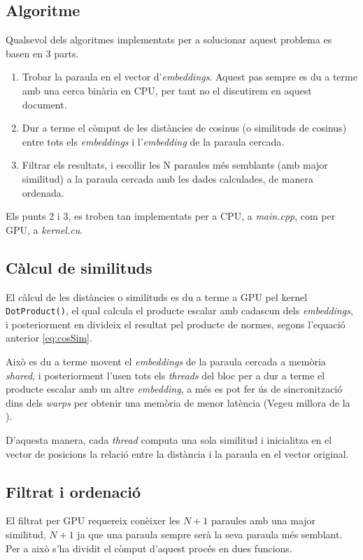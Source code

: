 \documentclass[catalan,10pt,a4paper]{article}
\begin{document}
\subsection*{Algoritme}
Qualsevol dels algoritmes implementats per a solucionar aquest problema es basen en 3 parts.
\begin{enumerate}
	\item Trobar la paraula en el vector d'\textit{embeddings}. Aquest pas sempre es du a terme amb una cerca binària en CPU, per tant no el discutirem en aquest document.
	\item Dur a terme el còmput de les distàncies de cosinus (o similituds de cosinus) entre tots els \textit{embeddings} i l'\textit{embedding} de la paraula cercada.
	\item Filtrar els resultats, i escollir les N paraules més semblants (amb major similitud) a la paraula cercada amb les dades calculades, de manera ordenada.
\end{enumerate}

Els punts 2 i 3, es troben tan implementats per a CPU, a \textit{main.cpp}, com per GPU, a \textit{kernel.cu}.

\subsection*{Càlcul de similituds}
El càlcul de les distàncies o similituds es du a terme a GPU pel kernel \verb|DotProduct()|, el qual calcula el producte escalar amb cadascun dels \textit{embeddings}, i posteriorment en divideix el resultat pel producte de normes, segons l'equació anterior \ref{eq:cosSim}.

Això es du a terme movent el \textit{embeddings} de la paraula cercada a memòria \textit{shared}, i posteriorment l'usen tots els \textit{threads} del bloc per a dur a terme el producte escalar amb un altre \textit{embedding}, a més es pot fer ús de sincronització dins dels \textit{warps} per obtenir una memòria de menor latència (Vegeu millora de la ).

D'aquesta manera, cada \textit{thread} computa una sola similitud i inicialitza en el vector de posicions la relació entre la distància i la paraula en el vector original.


\subsection*{Filtrat i ordenació}
El filtrat per GPU requereix conèixer les $N+1$ paraules amb una major similitud, $N+1$ ja que una paraula sempre serà la seva paraula més semblant. Per a això s'ha dividit el còmput d'aquest procés en dues funcions.
\end{document}
